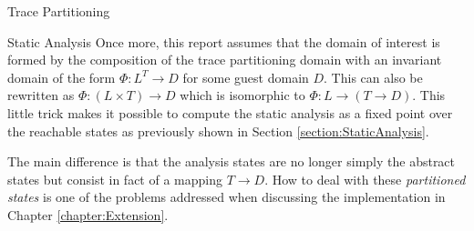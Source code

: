 \begin{chapter}{Trace Partitioning}

	\begin{section}{Static Analysis}
		\label{section:tracepartitioningstaticanalysis}
		Once more, this report assumes that the domain of interest is formed by the composition of the trace partitioning domain with an invariant domain of the form $\Phi: L^T \to D$ for some guest domain $D$. This can also be rewritten as $\Phi: (L \times T) \to D$ which is isomorphic to $\Phi: L \to (T \to D)$. This little trick makes it possible to compute the static analysis as a fixed point over the reachable states as previously shown in Section \ref{section:StaticAnalysis}. 

		The main difference is that the analysis states are no longer simply the abstract states but consist in fact of a mapping $T \to D$. How to deal with these \emph{partitioned states} is one of the problems addressed when discussing the implementation in Chapter \ref{chapter:Extension}.
	\end{section}

\end{chapter}
